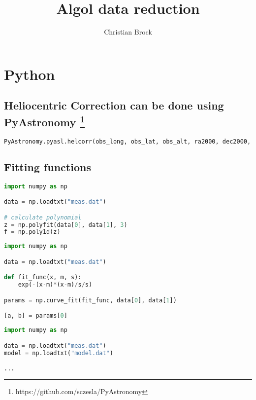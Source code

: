 \documentclass[10pt,a4paper,notitlepage]{report}
\author{Christian Brock}
\title{Algol data reduction}
\begin{document}
\maketitle

\section*{Python}

\subsection*{Heliocentric Correction can be done using PyAstronomy \footnote{https://github.com/sczesla/PyAstronomy}}
\begin{lstlisting}[language=Python,frame=single]
PyAstronomy.pyasl.helcorr(obs_long, obs_lat, obs_alt, ra2000, dec2000, jd, debug=False)
\end{lstlisting}

\subsection*{Fitting functions}

\begin{lstlisting}[language=Python,frame=single,caption={Using polyfit}]
import numpy as np

data = np.loadtxt("meas.dat")

# calculate polynomial
z = np.polyfit(data[0], data[1], 3)
f = np.poly1d(z)
\end{lstlisting}

\begin{lstlisting}[language=Python,frame=single,caption={Using curve\_fit}]
import numpy as np

data = np.loadtxt("meas.dat")

def fit_func(x, m, s):
    exp(-(x-m)*(x-m)/s/s)

params = np.curve_fit(fit_func, data[0], data[1])

[a, b] = params[0]
\end{lstlisting}


\begin{lstlisting}[language=Python,frame=single,caption={Or better}]
import numpy as np

data = np.loadtxt("meas.dat")
model = np.loadtxt("model.dat")

...

\end{lstlisting}


	
\end{document}
